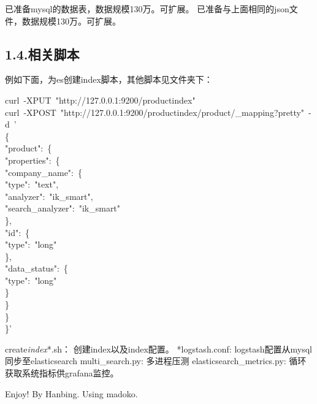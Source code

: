 \documentclass{article}
\begin{document}
\noindent{}已准备mysql的数据表，数据规模130万。可扩展。
已准备与上面相同的json文件，数据规模130万。可扩展。%

\subsection{1.4.\hspace*{0.5em}相关脚本}\label{section}%

\noindent{}例如下面，为es创建index脚本，其他脚本见文件夹下：%
\begin{mdpre}%
\noindent curl~-XPUT~"http://127.0.0.1:9200/productindex"\\
curl~-XPOST~"http://127.0.0.1:9200/productindex/product/\_mapping?pretty"~-d~'~\\
\{\\
"product":~\{\\
"properties":~\{\\
"company\_name":~\{\\
"type":~"text",\\
"analyzer":~"ik\_smart",\\
"search\_analyzer":~"ik\_smart"\\
\},\\
"id":~\{\\
"type":~"long"\\
\},\\
"data\_status":~\{\\
"type":~"long"\\
\}\\
\}\\
\}\\
\}'\\
\end{mdpre}\noindent{}create\emph{index}*.sh： 创建index以及index配置。        \mdbr
{}*logstash.conf: logstash配置从mysql同步至elasticsearch    \mdbr
{}multi\_search.py: 多进程压测    \mdbr
{}elasticsearch\_metrics.py: 循环获取系统指标供grafana监控。    
\begin{mdpre}%
\noindent{}%
\end{mdpre}\begin{mdflushright}%
\noindent{}\hspace*{1ex}\hspace*{1ex}
Enjoy! By Hanbing.    \mdbr
{}Using madoko.%
\end{mdflushright}%
\end{document}
